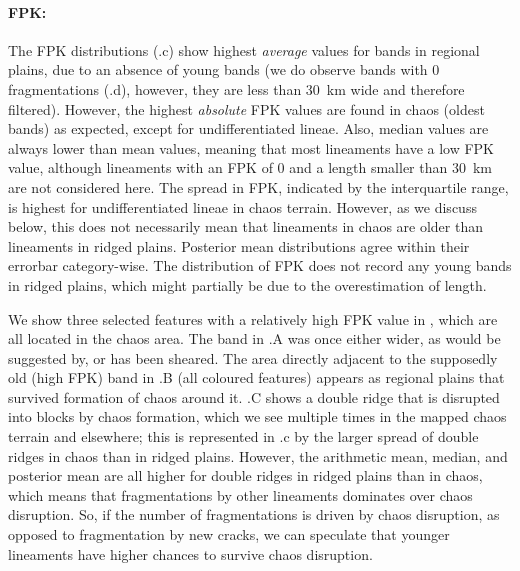 \paragraph{FPK:}
The FPK distributions (.c) show highest \textit{average} values for bands in regional plains, due to an absence of young bands (we do observe bands with 0 fragmentations (.d), however, they are less than 30~km wide and therefore filtered). However, the highest \textit{absolute} FPK values are found in chaos (oldest bands) as expected, except for undifferentiated lineae. Also, median values are always lower than mean values, meaning that most lineaments have a low FPK value, although lineaments with an FPK of 0 and a length smaller than 30~km are not considered here. The spread in FPK, indicated by the interquartile range, is highest for undifferentiated lineae in chaos terrain. However, as we discuss below, this does not necessarily mean that lineaments in chaos are older than lineaments in ridged plains. Posterior mean distributions agree within their errorbar category-wise. The distribution of FPK does not record any young bands in ridged plains, which might partially be due to the overestimation of length.

We show three selected features with a relatively high FPK value in , which are all located in the chaos area. The band in .A was once either wider, as would be suggested by, or has been sheared. The area directly adjacent to the supposedly old (high FPK) band in .B (all coloured features) appears as regional plains that survived formation of chaos around it. .C shows a double ridge that is disrupted into blocks by chaos formation, which we see multiple times in the mapped chaos terrain and elsewhere; this is represented in .c by the larger spread of double ridges in chaos than in ridged plains. However, the arithmetic mean, median, and posterior mean are all higher for double ridges in ridged plains than in chaos, which means that fragmentations by other lineaments dominates over chaos disruption. So, if the number of fragmentations is driven by chaos disruption, as opposed to fragmentation by new cracks, we can speculate that younger lineaments have higher chances to survive chaos disruption. 


